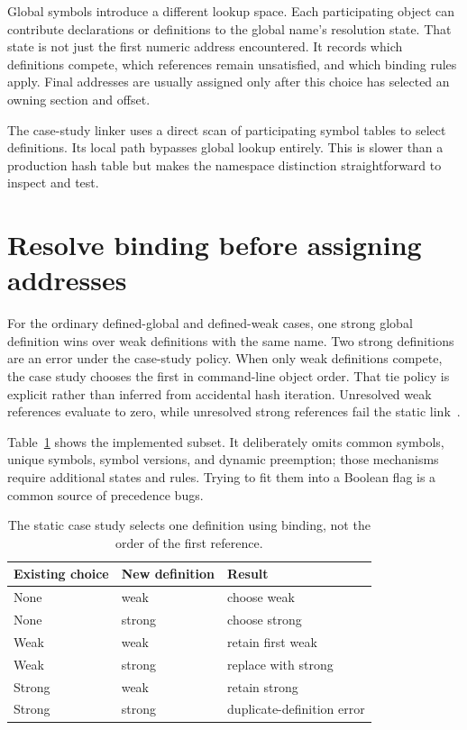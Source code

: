 Global symbols introduce a different lookup space.
Each participating object can contribute declarations or definitions to the global name's resolution state.
That state is not just the first numeric address encountered.
It records which definitions compete, which references remain unsatisfied, and which binding rules apply.
Final addresses are usually assigned only after this choice has selected an owning section and offset.

The case-study linker uses a direct scan of participating symbol tables to select definitions.
Its local path bypasses global lookup entirely.
This is slower than a production hash table but makes the namespace distinction straightforward to inspect and test.

\section{Resolve binding before assigning addresses}
\label{sec:ch57-binding}

For the ordinary defined-global and defined-weak cases, one strong global definition wins over weak definitions with the same name.
Two strong definitions are an error under the case-study policy.
When only weak definitions compete, the case study chooses the first in command-line object order.
That tie policy is explicit rather than inferred from accidental hash iteration.
Unresolved weak references evaluate to zero, while unresolved strong references fail the static link~\cite{xinuos-2026-elf}.

Table~\ref{tab:ch57-binding} shows the implemented subset.
It deliberately omits common symbols, unique symbols, symbol versions, and dynamic preemption; those mechanisms require additional states and rules.
Trying to fit them into a Boolean  flag is a common source of precedence bugs.

\begin{table}[htbp]
\caption{The static case study selects one definition using binding, not the order of the first reference.}
\label{tab:ch57-binding}
\centering
\begin{tabular}{lll}
\toprule
Existing choice & New definition & Result \\
\midrule
None & weak & choose weak \\
None & strong & choose strong \\
Weak & weak & retain first weak \\
Weak & strong & replace with strong \\
Strong & weak & retain strong \\
Strong & strong & duplicate-definition error \\
\bottomrule
\end{tabular}
\end{table}

